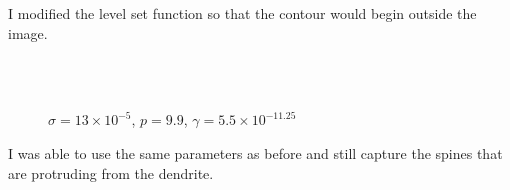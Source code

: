 \documentclass[margin=1in,12pt,3p]{elsarticle}
\begin{document}
I modified the level set function so that the contour would begin outside the image.
\begin{figure}[h!]
  \centering
  \hfill
  \\
  \\
  \caption{$\sigma = 13\times 10^{-5}$, $p = 9.9$, $\gamma=5.5\times 10^{-11.25}$}
\end{figure}

I was able to use the same parameters as before and still capture the spines that are protruding from the dendrite.
\end{document}
